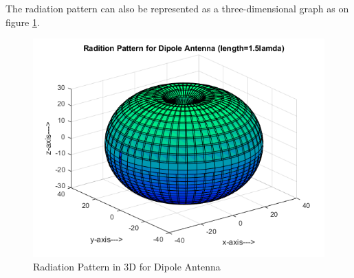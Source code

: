 The radiation pattern can also be represented as a three-dimensional graph as on figure \ref{fig:radiation_pattern_3d}. 
\begin{figure}[H]
	\centering
	\includegraphics[scale=0.6]{figures/radiation_pattern_3d.png}
	\caption{Radiation Pattern in 3D for Dipole Antenna}
	\label{fig:radiation_pattern_3d}
\end{figure}
